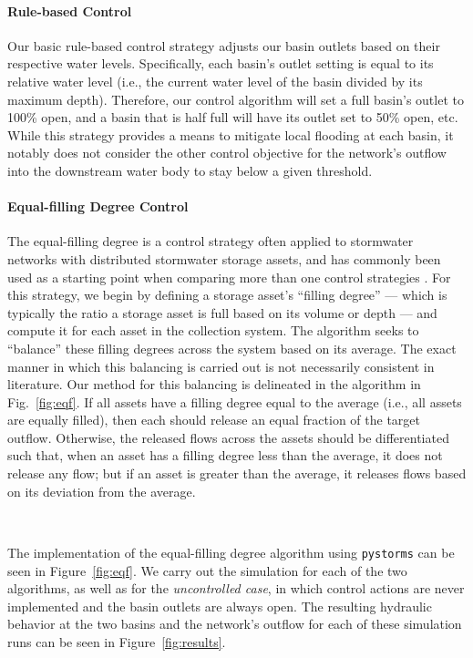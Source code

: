\paragraph{Rule-based Control}
Our basic rule-based control strategy adjusts our basin outlets based on their respective water levels. Specifically, each basin's outlet setting is equal to its relative water level (i.e., the current water level of the basin divided by its maximum depth). Therefore, our control algorithm will set a full basin's outlet to 100\% open, and a basin that is half full will have its outlet set to 50\% open, etc. While this strategy provides a means to mitigate local flooding at each basin, it notably does not consider the other control objective for the network's outflow into the downstream water body to stay below a given threshold.
%
%
%
\paragraph{Equal-filling Degree Control}
The equal-filling degree is a control strategy often applied to stormwater networks with distributed stormwater storage assets, and has commonly been used as a starting point when comparing more than one control strategies \citep{Borsanyi2008, Campisano2000, Dirckz2011, Kroll2016, vezzaro2014}. For this strategy, we begin by defining a storage asset's ``filling degree'' --- which is typically the ratio a storage asset is full based on its volume or depth --- and compute it for each asset in the collection system. The algorithm seeks to ``balance'' these filling degrees across the system based on its average. The exact manner in which this balancing is carried out is not necessarily consistent in literature. Our method for this balancing is delineated in the algorithm in Fig.~\ref{fig:eqf}. If all assets have a filling degree equal to the average (i.e., all assets are equally filled), then each should release an equal fraction of the target outflow. Otherwise, the released flows across the assets should be differentiated such that, when an asset has a filling degree less than the average, it does not release any flow; but if an asset is greater than the average, it releases flows based on its deviation from the average. 

\

The implementation of the equal-filling degree algorithm using \texttt{pyst\-orms} can be seen in Figure~\ref{fig:eqf}. We carry out the simulation for each of the two algorithms, as well as for the \emph{uncontrolled case}, in which control actions are never implemented and the basin outlets are always open. The resulting hydraulic behavior at the two basins and the network's outflow for each of these simulation runs can be seen in Figure~\ref{fig:results}. 

